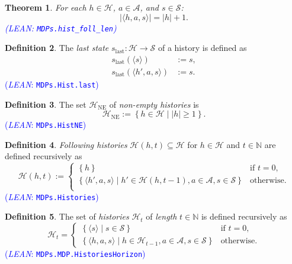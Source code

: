 \documentclass[letterpaper]{article}
\theoremstyle{plain}
\newtheorem{theorem}{Theorem}[subsection]
\theoremstyle{definition}
\newtheorem{definition}[theorem]{Definition}
\theoremstyle{remark}
\newcommand{\Nats}{\mathbb{N}}
\newcommand{\lean}[1]{\textcolor{blue}{(\emph{LEAN}: \texttt{#1})}}
\newcommand{\leanok}{}
\begin{document}
\begin{theorem} \label{thm:hist-foll-len}
For each $h\in \mathcal{H}$, $a\in \mathcal{A}$, and $s\in \mathcal{S}$:
\[
  |\langle h, a, s \rangle| = |h| + 1.
\]
\lean{MDPs.hist\_foll\_len} \leanok
\end{theorem}

\begin{definition} \label{def:hist-last}
The \emph{last state} $s_{\mathrm{last}}\colon \mathcal{H} \to \mathcal{S}$ of a history is defined as
\begin{align*}
  s_{\mathrm{last}}(\langle s \rangle) &:= s, \\
  s_{\mathrm{last}}(\langle h', a, s \rangle) &:= s.
\end{align*}
\lean{MDPs.Hist.last} \leanok
\end{definition}

\begin{definition} \label{def:hist-ne}
The set $\mathcal{H}_{\mathrm{NE}}$ of \emph{non-empty histories} is
\[
\mathcal{H}_{\mathrm{NE}} := \left\{ h \in \mathcal{H} \mid  |h| \ge 1 \right\}.
\]
\lean{MDPs.HistNE} \leanok
\end{definition}

\begin{definition}\label{def:histories}
  \emph{Following histories} $\mathcal{H}(h,t) \subseteq \mathcal{H}$ for $h\in \mathcal{H}$ and $t\in \Nats$ are defined recursively as
  \[
    \mathcal{H}(h,t) :=
    \begin{cases}
    \left\{  h \right\}  &\text{if } t = 0, \\
    \left\{  \langle h', a, s \rangle \mid h'\in \mathcal{H}(h, t-1), a\in \mathcal{A}, s\in \mathcal{S}  \right\}  &\text{otherwise}. \\
    \end{cases}
  \]
  \lean{MDPs.Histories} \leanok
\end{definition}

\begin{definition} \label{def:histories-horizon}
  The set of \emph{histories} $\mathcal{H}_{t}$ of \emph{length} $t \in \Nats$ is defined recursively as
  \[
    \mathcal{H}_t =
    \begin{cases}
      \left\{ \langle s \rangle \mid  s\in \mathcal{S} \right\} &\text{if } t = 0, \\
      \left\{ \langle h, a, s\rangle \mid h \in \mathcal{H}_{t-1}, a\in \mathcal{A}, s\in \mathcal{S} \right\} &\text{otherwise}.
    \end{cases}
  \]
  \lean{MDPs.MDP.HistoriesHorizon} \leanok
\end{definition}
\end{document}
